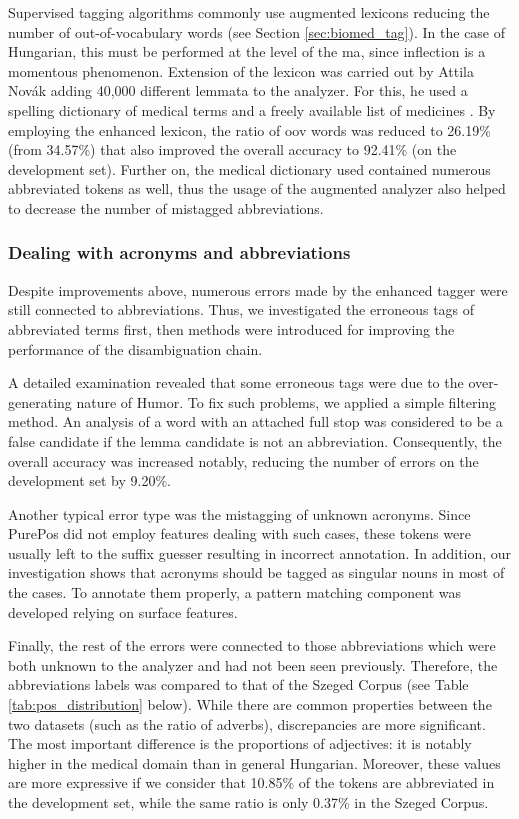 Supervised tagging algorithms commonly use augmented lexicons reducing the number of out-of-vocabulary words (see Section \ref{sec:biomed_tag}). 
In the case of Hungarian, this must be performed at the level of the \acrlong{ma}, since inflection is a momentous phenomenon. 
Extension of the lexicon was carried out by Attila Novák \cite{Orosz2014} adding 40,000 different lemmata to the analyzer. 
For this, he used a spelling dictionary of medical terms \cite{Fabian1992} and a freely available list of medicines \cite{Foigazgatosag2012}.
By employing the enhanced lexicon, the ratio of \acrshort{oov} words was reduced to 26.19\% (from 34.57\%) that also improved the overall accuracy to 92.41\% (on the development set). 
Further on, the medical dictionary \cite{Fabian1992} used contained numerous abbreviated tokens as well, thus the usage of the augmented analyzer also helped to decrease the number of mistagged abbreviations.

\subsubsection{Dealing with acronyms and abbreviations}

Despite improvements above, numerous errors made by the enhanced tagger were still connected to abbreviations. 
Thus, we investigated the erroneous tags of abbreviated terms first, then methods were introduced for improving the performance of the disambiguation chain. 

A detailed examination revealed that some erroneous tags were due to the over-generating nature of Humor. 
To fix such problems, we applied a simple filtering method. 
An analysis of a word with an attached full stop was considered to be a false candidate if the lemma candidate is not an abbreviation. 
Consequently, the overall accuracy was increased notably, reducing the number of errors on the development set by 9.20\%.

Another typical error type was the mistagging of unknown acronyms. 
Since PurePos did not employ features  dealing with such cases, these tokens were usually left to the suffix guesser resulting in incorrect annotation. 
In addition, our investigation shows that acronyms should be tagged as singular nouns in most of the cases. 
To annotate them properly, a pattern matching component was developed relying on surface features.

Finally, the rest of the errors were connected to those abbreviations which were both unknown to the analyzer and had not been seen previously. 
Therefore, the abbreviations labels was compared to that of the Szeged Corpus (see Table \ref{tab:pos_distribution} below).
While there are common properties between the two datasets (such as the ratio of adverbs), discrepancies are more significant. 
The most important difference is the proportions of adjectives: it is notably higher in the medical domain than in general Hungarian. 
Moreover, these values are more expressive if we consider that 10.85\% of the tokens are abbreviated in the development set, while the same ratio is only 0.37\% in the Szeged Corpus. 

